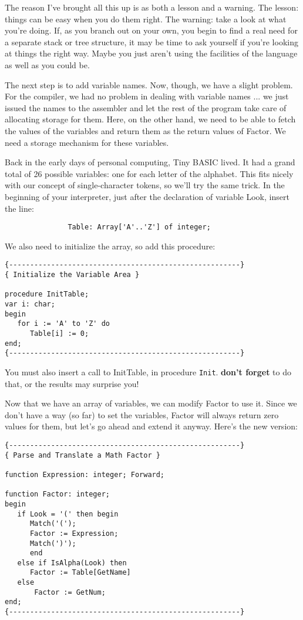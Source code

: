 The reason  I've  brought  all  this up is as both a lesson and a warning. The lesson: things can be easy when you do  them right. The warning: take a look at what you're doing. If, as you branch out on  your  own, you  begin to find a real need for a separate stack or tree structure, it may be time to ask yourself if you're looking at things the right way. Maybe you just aren't using the facilities of the language as well as you could be.

The next step is to add variable names. Now, though, we have a slight problem. For  the  compiler, we had no problem in dealing with variable names ... we just issued the names to the assembler and let the rest  of  the program take care of allocating storage for  them. Here, on the other hand, we need to be able to  fetch the values of the variables and return them as the  return values of Factor. We need a storage mechanism for these variables.

Back in the early days of personal computing, Tiny  BASIC lived. It had  a  grand  total  of  26  possible variables: one for each letter of the  alphabet. This  fits nicely with our concept of single-character tokens, so we'll  try  the  same  trick. In the beginning of your  interpreter, just  after  the  declaration of variable Look, insert the line:

\begin{verbatim}
               Table: Array['A'..'Z'] of integer;
\end{verbatim}

We also need to initialize the array, so add this procedure:

\begin{verbatim}
{-------------------------------------------------------}
{ Initialize the Variable Area }

procedure InitTable;
var i: char;
begin
   for i := 'A' to 'Z' do
      Table[i] := 0;
end;
{-------------------------------------------------------}
\end{verbatim}

You must also insert a call to InitTable, in procedure {\tt Init}. {\bfseries don't forget} to do that, or the results may surprise you!

Now that we have an array  of  variables, we can modify Factor to use it. Since we don't have a way (so far) to set the variables, Factor  will always return zero values for  them, but  let's  go ahead and extend it anyway. Here's the new version:

\begin{verbatim}
{-------------------------------------------------------}
{ Parse and Translate a Math Factor }

function Expression: integer; Forward;

function Factor: integer;
begin
   if Look = '(' then begin
      Match('(');
      Factor := Expression;
      Match(')');
      end
   else if IsAlpha(Look) then
      Factor := Table[GetName]
   else
       Factor := GetNum;
end;
{-------------------------------------------------------}
\end{verbatim}

